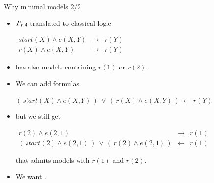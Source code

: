 \documentclass{beamer}
\begin{document}
\begin{frame}{Why minimal models 2/2}
	\onslide<+->
	
	\begin{itemize}
		\item $P_{r,4}$ translated to classical logic
			\begin{center}
				$\begin{array}{rcl}
				start(X) \wedge e(X,Y) & \rightarrow & r(Y) \\
				r(X) \wedge e(X,Y) & \rightarrow & r(Y)
				\end{array}$
			\end{center}
		
		\item has also models containing $r(1)$ or $r(2)$.
		
		\onslide<+->
		
		\item We can add formulas
			\begin{center}
				$(\,start(X) \wedge e(X,Y)\,)\ \vee\ (\,r(X) \wedge e(X,Y)\,) \ \leftarrow \ r(Y)$
			\end{center}
		
		\onslide<+->
		
		\item but we still get
			\begin{center}
				$\begin{array}{rcl}
				r(2) \wedge e(2,1) & \rightarrow & r(1) \\
				(\,start(2) \wedge e(2,1)\,)\ \vee\ (\,r(2) \wedge e(2,1)\,) & \leftarrow & r(1)
				\end{array}$
			\end{center}
			that admits models with $r(1)$ and $r(2)$.
		
		\onslide<+->
		
		\item We want .
		
	\end{itemize}
	
\end{frame}
\end{document}

